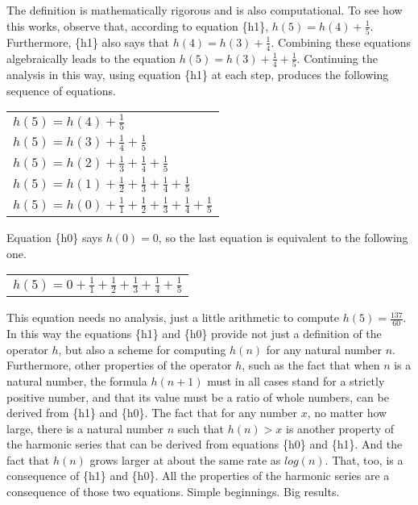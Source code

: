 The definition is mathematically rigorous
and is also computational.
To see how this works, observe that, according to equation \{h1\},
$h(5) = h(4)+\frac{1}{5}$.
Furthermore, \{h1\} also says that $h(4) = h(3)+\frac{1}{4}$.
Combining these equations algebraically leads to the equation
$h(5) = h(3)+\frac{1}{4}+\frac{1}{5}$.
Continuing the analysis in this way, using equation \{h1\} at each step,
produces the following sequence of equations.
\begin{center}
\begin{tabular}{l}
$h(5) = h(4) + \frac{1}{5}$ \\
$h(5) = h(3) + \frac{1}{4} + \frac{1}{5}$\\
$h(5) = h(2) + \frac{1}{3} + \frac{1}{4} + \frac{1}{5}$\\
$h(5) = h(1) + \frac{1}{2} + \frac{1}{3} + \frac{1}{4} + \frac{1}{5}$\\
$h(5) = h(0) + \frac{1}{1} + \frac{1}{2} + \frac{1}{3} + \frac{1}{4} + \frac{1}{5}$\\
\end{tabular}
\end{center}

Equation \{h0\} says $h(0) = 0$,
so the last equation is equivalent to the following one.
\begin{center}
\begin{tabular}{l}
$h(5) = 0 + \frac{1}{1} + \frac{1}{2} + \frac{1}{3} + \frac{1}{4} + \frac{1}{5}$\\
\end{tabular}
\end{center}

This equation needs no analysis, just a little arithmetic
to compute $h(5) = \frac{137}{60}$.
In this way the equations \{h1\} and \{h0\} provide not just
a definition of the operator $h$, but also a scheme for computing $h(n)$
for any natural number $n$.
Furthermore, other properties of the operator $h$,
such as the fact that when $n$ is a natural number, 
the formula $h(n+1)$ must in all cases stand for a strictly positive number,
and that its value must be a ratio of whole numbers,
can be derived from \{h1\} and \{h0\}.
The fact that for any number $x$, no matter how large,
there is a natural number $n$ such that $h(n) > x$
is another property of the harmonic series that can be
derived from equations \{h0\} and \{h1\}.
And the fact that $h(n)$ grows larger at about
the same rate as $log(n)$. That, too, is a consequence
of \{h1\} and \{h0\}. All the properties of the
harmonic series are a consequence of those two equations.
Simple beginnings. Big results.

